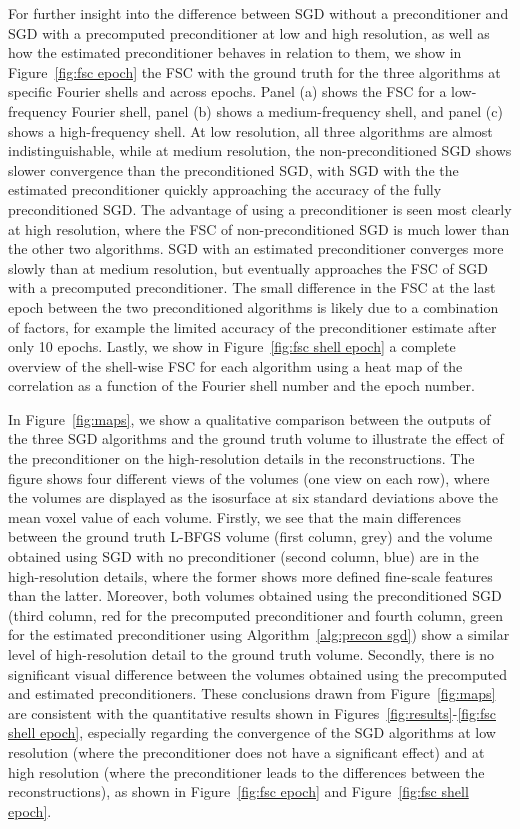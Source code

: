 \documentclass{article}
\begin{document}
For further insight into the difference between SGD without a preconditioner and 
SGD with a precomputed preconditioner at low and high resolution, as well as 
how the estimated preconditioner behaves in relation to them, we show
in Figure~\ref{fig:fsc epoch} the FSC with the ground truth for the three algorithms
at specific Fourier shells and across epochs.
Panel (a) shows the FSC for a low-frequency Fourier shell, panel (b) shows a 
medium-frequency shell, and panel (c) shows a high-frequency shell. 
At low resolution, all three algorithms are almost indistinguishable, while at medium 
resolution, the non-preconditioned SGD shows slower convergence than the preconditioned 
SGD, with SGD with the the estimated preconditioner quickly approaching the accuracy of 
the fully preconditioned SGD. 
The advantage of using a preconditioner is seen most clearly at high resolution,
where the FSC of non-preconditioned SGD is much lower than the other two algorithms. 
SGD with an estimated preconditioner converges more slowly than at medium resolution, 
but eventually approaches the FSC of SGD with a precomputed preconditioner. 
The small difference in the FSC at the last epoch
between the two preconditioned algorithms is likely due to a combination of factors,
for example the limited accuracy of the preconditioner estimate after only 10 epochs.
Lastly, we show in Figure~\ref{fig:fsc shell epoch} a complete overview of
the shell-wise FSC for each algorithm using a heat map of the correlation as a 
function of the Fourier shell number and the epoch number.

In Figure~\ref{fig:maps}, we show a qualitative comparison between the outputs of the three SGD algorithms and the ground truth volume to illustrate the effect of the preconditioner on the high-resolution details in the reconstructions.
The figure shows four different views of the volumes (one view on each row), where the volumes are displayed as the isosurface at six standard deviations above the mean voxel value of each volume. 
Firstly, we see that the main differences between the ground truth L-BFGS volume (first column, grey) and the volume obtained using SGD with no preconditioner (second column, blue) are in the high-resolution details, where the former shows more defined fine-scale features than the latter.
Moreover, both volumes obtained using the preconditioned SGD (third column, red for the precomputed preconditioner and fourth column, green for the estimated preconditioner using Algorithm~\ref{alg:precon sgd}) show a similar level of high-resolution detail to the ground truth volume.
Secondly, there is no significant visual difference between the volumes obtained using the precomputed and estimated preconditioners.
These conclusions drawn from Figure~\ref{fig:maps} are consistent with the quantitative results shown in Figures~\ref{fig:results}-\ref{fig:fsc shell epoch}, especially regarding the convergence of the SGD algorithms at low resolution (where the preconditioner does not have a significant effect) and at high resolution (where the preconditioner leads to the differences between the reconstructions), as shown in Figure~\ref{fig:fsc epoch} and Figure~\ref{fig:fsc shell epoch}.
\end{document}

